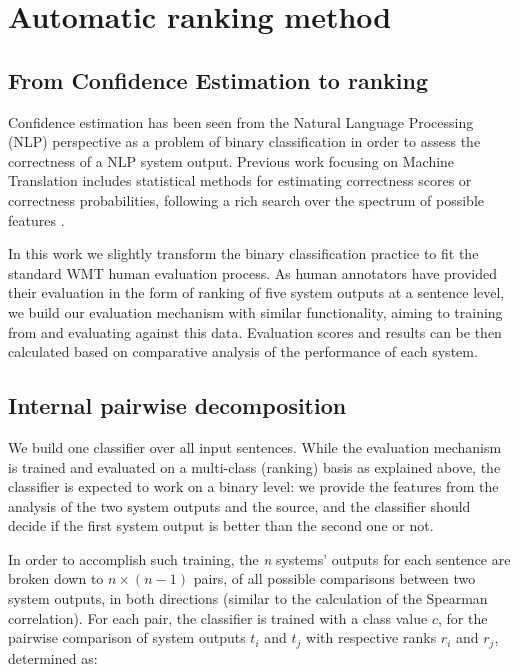 \documentclass[11pt]{article}
\begin{document}
\section{Automatic ranking method}
\subsection{From Confidence Estimation to ranking}
Confidence estimation has been seen from the Natural Language Processing (NLP)
perspective as a problem of binary classification in order to assess the
correctness of a NLP system output. Previous work focusing on Machine
Translation includes statistical methods for estimating correctness scores or
correctness probabilities, following a rich search over the spectrum of
possible features
\cite{Blatz04confidenceestimation,Ueffing05word-levelconfidence,Specia09TWSS,raybaud2009word,Rosti07combiningoutputs}.

In this work we slightly transform the binary classification practice to fit
the standard WMT human evaluation process. As human annotators have provided
their evaluation in the form of ranking of five system outputs at a sentence
level, we build our evaluation mechanism with similar functionality, aiming to
training from and evaluating against this data. Evaluation scores and results
can be then calculated based on comparative analysis of the performance of each
system.

\subsection{Internal pairwise decomposition\label{Internal pairwise
decomposition} }
We build one classifier over all input sentences. While the evaluation
mechanism is trained and evaluated on a multi-class (ranking) basis as explained
above, the classifier is expected to work on a binary level: we provide the
features from the analysis of the two system outputs and the source, and the
classifier should decide if the first system output is better than the second one or
not. 

In order to accomplish such training, the \textit{n} systems' outputs for each
sentence are broken down to \(n \times (n-1)\) pairs, of all possible
comparisons between two system outputs, in both directions (similar to the
calculation of the Spearman correlation).
% 
For each pair, the classifier is trained with a class value \(c\), for the
pairwise comparison of system outputs $t_i$ and $t_j$ with respective ranks
\(r_i\) and \(r_j\), determined as:
\end{document}
